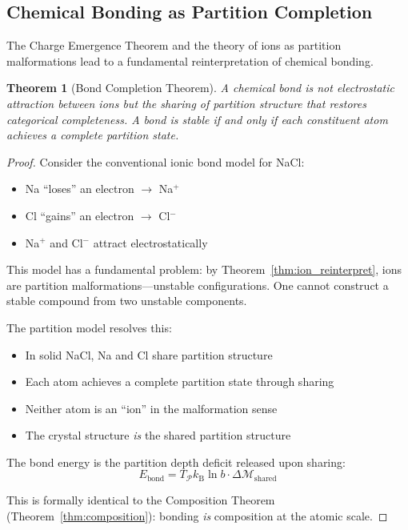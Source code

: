 \documentclass[twocolumn,10pt,a4paper]{article}
\newtheorem{theorem}{Theorem}[section]
\theoremstyle{definition}
\theoremstyle{remark}
\newcommand{\kB}{k_{\mathrm{B}}}
\newcommand{\Partition}{\mathcal{P}}
\newcommand{\Depth}{\mathcal{M}}
\begin{document}
\subsection{Chemical Bonding as Partition Completion}

The Charge Emergence Theorem and the theory of ions as partition malformations lead to a fundamental reinterpretation of chemical bonding.

\begin{theorem}[Bond Completion Theorem]
\label{thm:bond_completion}
A chemical bond is not electrostatic attraction between ions but the sharing of partition structure that restores categorical completeness. A bond is stable if and only if each constituent atom achieves a complete partition state.
\end{theorem}

\begin{proof}
Consider the conventional ionic bond model for NaCl:
\begin{itemize}
    \item Na ``loses'' an electron $\rightarrow$ Na$^+$
    \item Cl ``gains'' an electron $\rightarrow$ Cl$^-$
    \item Na$^+$ and Cl$^-$ attract electrostatically
\end{itemize}

This model has a fundamental problem: by Theorem~\ref{thm:ion_reinterpret}, ions are partition malformations---unstable configurations. One cannot construct a stable compound from two unstable components.

The partition model resolves this:
\begin{itemize}
    \item In solid NaCl, Na and Cl share partition structure
    \item Each atom achieves a complete partition state through sharing
    \item Neither atom is an ``ion'' in the malformation sense
    \item The crystal structure \emph{is} the shared partition structure
\end{itemize}

The bond energy is the partition depth deficit released upon sharing:
\begin{equation}
    E_{\text{bond}} = T_{\Partition} \kB \ln b \cdot \Delta\Depth_{\text{shared}}
\end{equation}

This is formally identical to the Composition Theorem (Theorem~\ref{thm:composition}): bonding \emph{is} composition at the atomic scale.
\end{proof}
\end{document}
